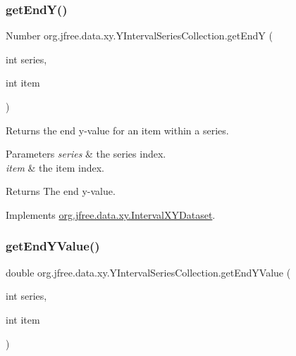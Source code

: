 \subsubsection{\texorpdfstring{get\+End\+Y()}{getEndY()}}
{\footnotesize\ttfamily Number org.\+jfree.\+data.\+xy.\+Y\+Interval\+Series\+Collection.\+get\+EndY (\begin{DoxyParamCaption}\item[{int}]{series,  }\item[{int}]{item }\end{DoxyParamCaption})}

Returns the end y-\/value for an item within a series.


\begin{DoxyParams}{Parameters}
{\em series} & the series index. \\
\hline
{\em item} & the item index.\\
\hline
\end{DoxyParams}
\begin{DoxyReturn}{Returns}
The end y-\/value. 
\end{DoxyReturn}


Implements \mbox{\hyperlink{interfaceorg_1_1jfree_1_1data_1_1xy_1_1_interval_x_y_dataset_ae938af574bad07e7f47a8b423223ef9b}{org.\+jfree.\+data.\+xy.\+Interval\+X\+Y\+Dataset}}.

\mbox{\label{classorg_1_1jfree_1_1data_1_1xy_1_1_y_interval_series_collection_a1a7adfd154a7e2ddf872f4edfeb09dc7}} 
\subsubsection{\texorpdfstring{get\+End\+Y\+Value()}{getEndYValue()}}
{\footnotesize\ttfamily double org.\+jfree.\+data.\+xy.\+Y\+Interval\+Series\+Collection.\+get\+End\+Y\+Value (\begin{DoxyParamCaption}\item[{int}]{series,  }\item[{int}]{item }\end{DoxyParamCaption})}

